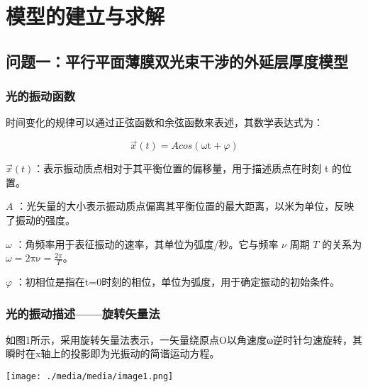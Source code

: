 \documentclass[
]{article}
\author{}
\date{}
\begin{document}
\hypertarget{ux6a21ux578bux7684ux5efaux7acbux4e0eux6c42ux89e3}{%
\section{模型的建立与求解}\label{ux6a21ux578bux7684ux5efaux7acbux4e0eux6c42ux89e3}}

\hypertarget{ux95eeux9898ux4e00ux5e73ux884cux5e73ux9762ux8584ux819cux53ccux5149ux675fux5e72ux6d89ux7684ux5916ux5ef6ux5c42ux539aux5ea6ux6a21ux578b}{%
\subsection{问题一：平行平面薄膜双光束干涉的外延层厚度模型}\label{ux95eeux9898ux4e00ux5e73ux884cux5e73ux9762ux8584ux819cux53ccux5149ux675fux5e72ux6d89ux7684ux5916ux5ef6ux5c42ux539aux5ea6ux6a21ux578b}}

\hypertarget{ux5149ux7684ux632fux52a8ux51fdux6570}{%
\subsubsection{光的振动函数}\label{ux5149ux7684ux632fux52a8ux51fdux6570}}

时间变化的规律可以通过正弦函数和余弦函数来表述，其数学表达式为：

\[\overrightarrow{x}(t) = Acos(\text{ωt} + \varphi)\]

  \(\overrightarrow{x}(t)\)：表示振动质点相对于其平衡位置的偏移量，用于描述质点在时刻 t 的位置。

  \(A\) ：光矢量的大小表示振动质点偏离其平衡位置的最大距离，以米为单位，反映了振动的强度。

  \(\omega\) ：角频率用于表征振动的速率，其单位为弧度/秒。它与频率 \(\nu\) 周期 \(T\) 的关系为 \(\omega = 2\text{πν} = \frac{2\pi}{T}\)。

  \(\varphi\) ：初相位是指在t=0时刻的相位，单位为弧度，用于确定振动的初始条件。

\hypertarget{ux5149ux7684ux632fux52a8ux63cfux8ff0ux65cbux8f6cux77e2ux91cfux6cd5}{%
\subsubsection{光的振动描述------旋转矢量法}\label{ux5149ux7684ux632fux52a8ux63cfux8ff0ux65cbux8f6cux77e2ux91cfux6cd5}}

如图1所示，采用旋转矢量法表示，一矢量绕原点O以角速度ω逆时针匀速旋转，其瞬时在x轴上的投影即为光振动的简谐运动方程。

\texttt{[image: ./media/media/image1.png]}
\end{document}
